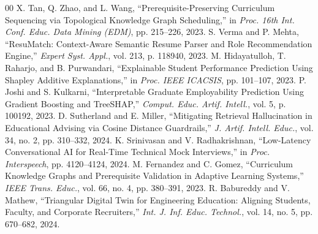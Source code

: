 \documentclass[conference]{IEEEtran}
\begin{document}
{\begin{thebibliography}{00}
 X. Tan, Q. Zhao, and L. Wang, ``Prerequisite-Preserving Curriculum Sequencing via Topological Knowledge Graph Scheduling,'' in \textit{Proc. 16th Int. Conf. Educ. Data Mining (EDM)}, pp. 215--226, 2023.
 S. Verma and P. Mehta, ``ResuMatch: Context-Aware Semantic Resume Parser and Role Recommendation Engine,'' \textit{Expert Syst. Appl.}, vol. 213, p. 118940, 2023.
 M. Hidayatulloh, T. Raharjo, and B. Purwandari, ``Explainable Student Performance Prediction Using Shapley Additive Explanations,'' in \textit{Proc. IEEE ICACSIS}, pp. 101--107, 2023.
 P. Joshi and S. Kulkarni, ``Interpretable Graduate Employability Prediction Using Gradient Boosting and TreeSHAP,'' \textit{Comput. Educ. Artif. Intell.}, vol. 5, p. 100192, 2023.
 D. Sutherland and E. Miller, ``Mitigating Retrieval Hallucination in Educational Advising via Cosine Distance Guardrails,'' \textit{J. Artif. Intell. Educ.}, vol. 34, no. 2, pp. 310--332, 2024.
 K. Srinivasan and V. Radhakrishnan, ``Low-Latency Conversational AI for Real-Time Technical Mock Interviews,'' in \textit{Proc. Interspeech}, pp. 4120--4124, 2024.
 M. Fernandez and C. Gomez, ``Curriculum Knowledge Graphs and Prerequisite Validation in Adaptive Learning Systems,'' \textit{IEEE Trans. Educ.}, vol. 66, no. 4, pp. 380--391, 2023.
 R. Babureddy and V. Mathew, ``Triangular Digital Twin for Engineering Education: Aligning Students, Faculty, and Corporate Recruiters,'' \textit{Int. J. Inf. Educ. Technol.}, vol. 14, no. 5, pp. 670--682, 2024.
\end{thebibliography}
}
\end{document}
